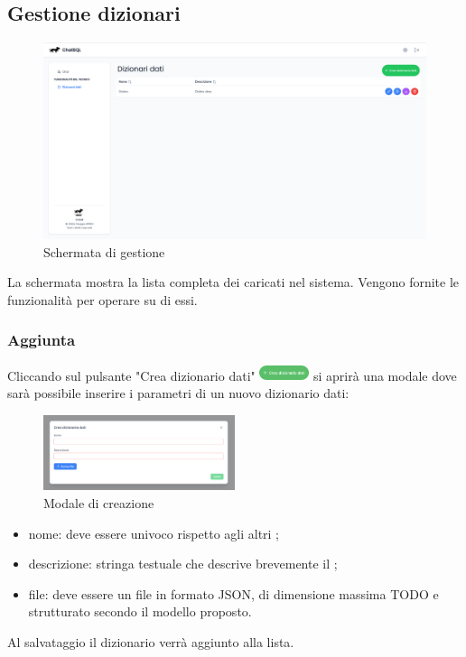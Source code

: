 \subsection{Gestione dizionari}
\begin{figure}[H]
  \centering
  \includegraphics[width=1\textwidth]{assets/dd_list.png}
  \caption{Schermata di gestione }
\end{figure}
\par La schermata mostra la lista completa dei  caricati nel sistema. Vengono fornite le funzionalità per operare su di essi.

\subsubsection{Aggiunta }
Cliccando sul pulsante "Crea dizionario dati" \includegraphics[height=1.2em]{assets/dd_create_button.png} si aprirà una modale dove sarà possibile inserire i parametri di un nuovo dizionario dati:
\begin{figure}[H]
  \centering
  \includegraphics[width=0.5\textwidth]{assets/dd_modal_create.png}
  \caption{Modale di creazione }
\end{figure}
\begin{itemize}
  \item nome: deve essere univoco rispetto agli altri ;
  \item descrizione: stringa testuale che descrive brevemente il ;
  \item file: deve essere un file in formato JSON, di dimensione massima TODO e strutturato secondo il modello proposto.
\end{itemize}
Al salvataggio il dizionario verrà aggiunto alla lista.

